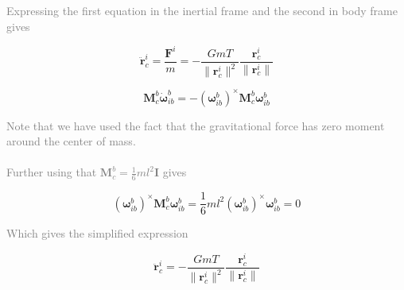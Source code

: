 \textcolor{gray}{Expressing the first equation in the inertial frame and the second in body frame gives}

\begin{equation}
    \ddot{\mathbf{r}}_c^i = \frac{\mathbf{F}^i}{m} = -\frac{G m T}{\|\mathbf{r}_c^i\|^2} \frac{\mathbf{r}_c^i}{\|\mathbf{r}_c^i\|}
\end{equation}

\begin{equation}
    \mathbf{M}_c^b \dot{\boldsymbol{\omega}}_{ib}^b = -\left( \boldsymbol{\omega}_{ib}^b \right)^\times \mathbf{M}_c^b \boldsymbol{\omega}_{ib}^b
\end{equation}

\textcolor{gray}{Note that we have used the fact that the gravitational force has zero moment around the center of mass.}
\\
\\
\textcolor{gray}{Further using that $\mathbf{M}_c^b = \frac{1}{6} m l^2 \mathbf{I}$ gives}

\begin{equation}
    \left( \boldsymbol{\omega}_{ib}^b \right)^\times \mathbf{M}_c^b \boldsymbol{\omega}_{ib}^b = \frac{1}{6} m l^2 \left( \boldsymbol{\omega}_{ib}^b \right)^\times \boldsymbol{\omega}_{ib}^b = 0
\end{equation}

\textcolor{gray}{Which gives the simplified expression}

\begin{equation}
    \ddot{\mathbf{r}}_c^i = -\frac{G m T}{\|\mathbf{r}_c^i\|^2} \frac{\mathbf{r}_c^i}{\|\mathbf{r}_c^i\|}
\end{equation}

